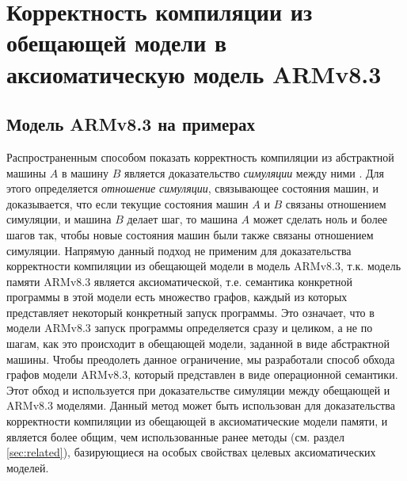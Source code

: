 \chapter{Корректность компиляции из обещающей модели в аксиоматическую модель ARMv8.3} \label{sec:armv83}

\section{Модель ARMv8.3 на примерах} \label{sec:armv83examples}
Распространенным способом показать корректность компиляции из абстрактной машины $A$ в машину $B$
является доказательство \emph{симуляции} между ними \cite{Milner:Book89}. Для этого определяется \emph{отношение симуляции},
связывающее состояния машин, и доказывается, что если текущие состояния машин $A$ и $B$ связаны отношением
симуляции, и машина $B$ делает шаг, то машина $A$ может сделать ноль и более шагов так, чтобы новые состояния
машин были также связаны отношением симуляции. Напрямую данный подход не применим для доказательства
корректности компиляции из обещающей модели в модель ARMv8.3, т.к.
модель памяти ARMv8.3 является аксиоматической, т.е. семантика конкретной программы в этой модели есть
множество графов, каждый из которых представляет некоторый конкретный запуск программы. Это означает, что
в модели ARMv8.3 запуск программы определяется сразу и целиком, а не по шагам, как это происходит в
обещающей модели, заданной в виде абстрактной машины.
Чтобы преодолеть данное ограничение, мы разработали способ обхода графов модели ARMv8.3,
который представлен в виде операционной семантики.
Этот обход и используется при доказательстве симуляции между обещающей и ARMv8.3 моделями.
Данный метод может быть использован для доказательства корректности компиляции из
обещающей в аксиоматические модели памяти, и является более общим, чем использованные ранее методы
(см. раздел \ref{sec:related}), базирующиеся на особых свойствах целевых аксиоматических моделей.

